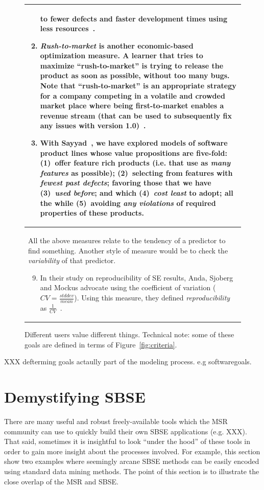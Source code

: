 \documentclass[table, xcdraw, sigconf,review, anonymous]{acmart}
\begin{document}
\begin{figure}[!t]
\begin{tabular}{p{.95\linewidth}}
\begin{enumerate}[leftmargin=0.4cm]
to fewer defects and faster development times using less resources~\cite{elrawas10,me07f,me09a,me09f}.
\item {\em  Rush-to-market} is another economic-based optimization measure.
A learner that tries to maximize ``rush-to-market'' is trying to release the product as soon
as possible, without too many bugs. Note that ``rush-to-market'' is an appropriate strategy for a company competing
in a volatile and crowded market place where being first-to-market enables a revenue stream (that can be
used to subsequently fix any issues with version 1.0)~\cite{huang06}.
\item
With Sayyad~\cite{sayyad13a,sayyad13b}, we have explored models of software product
lines whose value propositions are five-fold:
(1)~offer feature rich products (i.e. that
use as {\em many features} as possible);
(2)~selecting from features with {\em fewest past defects};
favoring those that we have (3)~{\em used before}; and which
(4)~{\em cost
least} to adopt; all the while (5)~avoiding {\em any violations} of
required properties of these
products.
\end{enumerate}
\\ \hline
All the above measures relate to the tendency of a predictor to find something. Another style
of measure would be to check the {\em variability} of that predictor.
\begin{enumerate}[leftmargin=0.4cm]
\setcounter{enumi}{8}
\item
In their study on reproducibility of SE results,
 Anda, Sjoberg and Mockus advocate using the coefficient of variation ($CV=\frac{stddev}{mean}$).
Using this measure, they defined {\em reproducibility} as $\frac{1}{CV}$~\cite{mockus09}.
\end{enumerate}\\\hline
\end{tabular}
\caption[Different users value different things.]{Different users value different things.
Technical note:  some of
these goals are defined in terms of
Figure~\ref{fig:criteria}.
}\label{fig:goals}
\end{figure}


XXX defterming goals actaully part of the modeling process. e.g softwaregoals.

\section{Demystifying SBSE}

There are many useful and robust freely-available   tools which
the MSR community can use to quickly build their own SBSE applications (e.g. XXX).
That said, sometimes it is insightful to look ``under the hood'' of these tools in order to gain more insight about the
processes involved. 
For example, this section show two   examples where  seemingly arcane SBSE methods can be easily encoded
using standard data mining methods. The point of this section is to illustrate the close overlap of the
MSR and SBSE.
\end{document}
